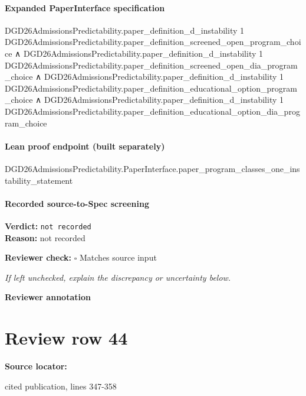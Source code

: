 \documentclass[10pt]{article}
\newcommand{\reviewerbox}{%
  \par\noindent\fbox{\parbox{0.96\linewidth}{\rule{0pt}{0.38in}}}\par
}
\newcommand{\reviewmatch}[1]{%
  \par\noindent\textbf{Reviewer check:} $\square$\; #1\par
  \noindent\emph{If left unchecked, explain the discrepancy or uncertainty below.}\par
}
\begin{document}
\paragraph{Expanded PaperInterface specification}
\begin{ReviewVerbatim}
DGD26AdmissionsPredictability.paper_definition_d_instability 1
    DGD26AdmissionsPredictability.paper_definition_screened_open_program_choice ∧
  DGD26AdmissionsPredictability.paper_definition_d_instability 1
      DGD26AdmissionsPredictability.paper_definition_screened_open_dia_program_choice ∧
    DGD26AdmissionsPredictability.paper_definition_d_instability 1
        DGD26AdmissionsPredictability.paper_definition_educational_option_program_choice ∧
      DGD26AdmissionsPredictability.paper_definition_d_instability 1
        DGD26AdmissionsPredictability.paper_definition_educational_option_dia_program_choice
\end{ReviewVerbatim}

\paragraph{Lean proof endpoint (built separately)}\begin{ReviewVerbatim}
DGD26AdmissionsPredictability.PaperInterface.paper_program_classes_one_instability_statement
\end{ReviewVerbatim}

\paragraph{Recorded source-to-Spec screening}
\textbf{Verdict:} \texttt{not recorded}
\\
\textbf{Reason:} not recorded
\reviewmatch{Matches source input}
\noindent\textbf{Reviewer annotation}\par
\reviewerbox
\clearpage
\hypertarget{source-claim-f595f3e6af0e1b40}{}
\section*{Review row 44}
\textbf{Source locator:} {\footnotesize\raggedright cited publication, lines 347-\allowbreak{}358\par}
\end{document}
